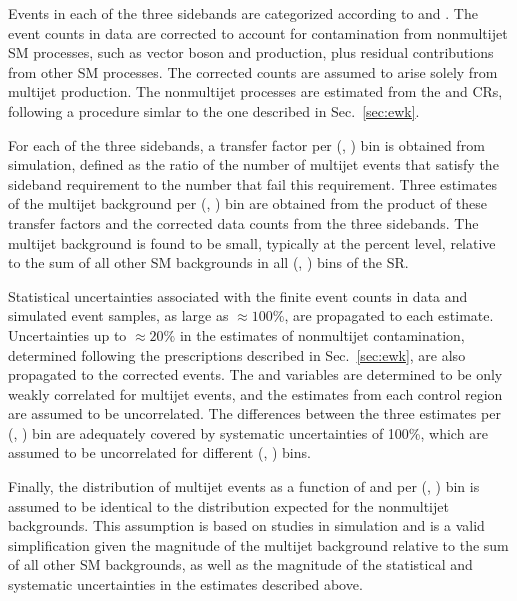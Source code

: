 Events in each of the three sidebands are categorized according to
\njet and \scalht. The event counts in data are corrected to account
for contamination from nonmultijet SM processes, such as vector boson
and \ttbar production, plus residual contributions from other SM
processes. The corrected counts are assumed to arise solely from
multijet production. The nonmultijet processes are estimated from the
\mj and \mmj CRs, following a procedure simlar to the one described in
Sec.~\ref{sec:ewk}. 

For each of the three sidebands, a transfer factor per (\njet,
\scalht) bin is obtained from simulation, defined as the ratio of the
number of multijet events that satisfy the sideband requirement to the
number that fail this requirement. Three estimates of the multijet
background per (\njet, \scalht) bin are obtained from the product of
these transfer factors and the corrected data counts from the three
sidebands. The multijet background is found to be small, typically at
the percent level, relative to the sum of all other SM backgrounds in
all (\njet, \nb) bins of the SR.

Statistical uncertainties associated with the finite event counts in
data and simulated event samples, as large as ${\approx}100\%$, are
propagated to each estimate. Uncertainties up to ${\approx}20\%$ in
the estimates of nonmultijet contamination, determined following the
prescriptions described in Sec.~\ref{sec:ewk}, are also propagated to
the corrected events. The \mhtmet and \bdphi variables are determined
to be only weakly correlated for multijet events, and the estimates
from each control region are assumed to be uncorrelated. The
differences between the three estimates per (\njet, \scalht) bin are
adequately covered by systematic uncertainties of 100\%, which are
assumed to be uncorrelated for different (\njet, \scalht) bins.

Finally, the distribution of multijet events as a function of \nb and
\mht per (\njet, \scalht) bin is assumed to be identical to the
distribution expected for the nonmultijet backgrounds. This assumption
is based on studies in simulation %
and is a valid simplification given the magnitude of the multijet
background relative to the sum of all other SM backgrounds, as well as
the magnitude of the statistical and systematic uncertainties in the
estimates described above.

